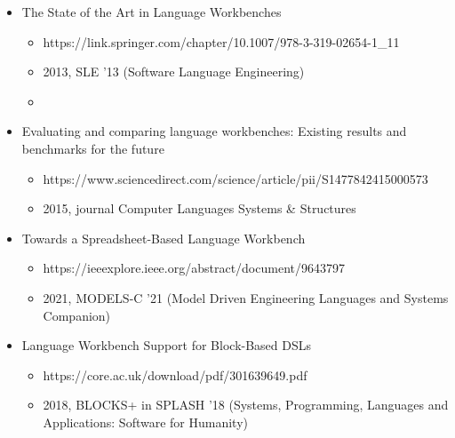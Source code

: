 \begin{itemize}
      \item The State of the Art in Language Workbenches
      \begin{itemize}
        \item https://link.springer.com/chapter/10.1007/978-3-319-02654-1\_11
        \item 2013, SLE '13 (Software Language Engineering)
        \item 
      \end{itemize}
      \item Evaluating and comparing language workbenches: Existing results and benchmarks for the future
      \begin{itemize}
        \item https://www.sciencedirect.com/science/article/pii/S1477842415000573
        \item 2015, journal Computer Languages Systems \& Structures
      \end{itemize}
      \item Towards a Spreadsheet-Based Language Workbench
      \begin{itemize}
        \item https://ieeexplore.ieee.org/abstract/document/9643797
        \item 2021, MODELS-C '21 (Model Driven Engineering Languages and Systems Companion)
      \end{itemize}
      \item Language Workbench Support for Block-Based DSLs
      \begin{itemize}
        \item https://core.ac.uk/download/pdf/301639649.pdf
        \item 2018, BLOCKS+ in SPLASH '18 (Systems, Programming, Languages and Applications: Software for Humanity)
      \end{itemize}
    \end{itemize}